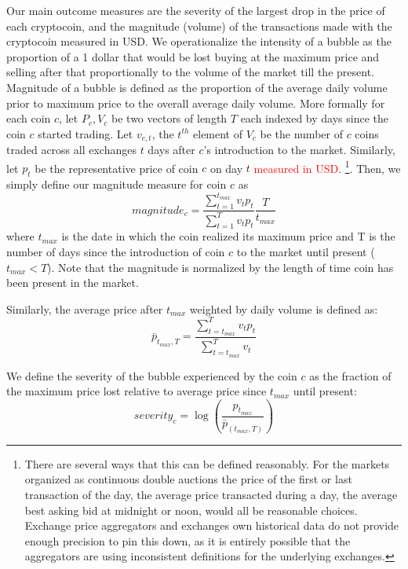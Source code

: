 Our main outcome measures are the severity of the largest drop in the price of each cryptocoin, and the magnitude (volume) of the transactions made with the cryptocoin measured in USD.
We operationalize the intensity of a bubble as the proportion of a 1 dollar that would be lost buying at the maximum price and selling after that proportionally to the volume of the market till the present. Magnitude of a bubble is defined as the proportion of the average daily volume prior to maximum price to the overall average daily volume.
More formally for each coin $c$, let $P_c,V_c$ be two vectors of length $T$ each indexed by days since the coin $c$ started trading.
Let $v_{c,t}$, the $t^{th}$ element of $V_c$ be the number of $c$ coins traded across all exchanges $t$ days after $c$'s introduction to the market. 
Similarly, let $p_t$ be the representative price of coin $c$ on day $t$ \textcolor{red}{measured in USD}.
\footnote{There are several ways that this can be defined reasonably. For the markets organized as continuous double auctions the price of the first or last transaction of the day,  the average price transacted during a day, the average best asking bid at midnight or noon, would all be reasonable choices. Exchange price aggregators and exchanges own historical data do not provide enough precision to pin this down, as it is entirely possible that the aggregators are using inconsistent definitions for the underlying exchanges.}. Then, we simply define our magnitude measure for coin $c$ as
\begin{equation}
magnitude_{c} = \frac{\sum_{t=1}^{t_{max}} v_t p_t} {\sum_{t=1}^{T} v_t  p_t} \frac{T}{t_{max}}
\end{equation}
where $t_{max}$ is the date in which the coin realized its maximum price and T is the number of days since the introduction of coin $c$ to the market until present ($t_{max} < T$). Note that the magnitude is normalized by the length of time coin has been present in the market.

Similarly, the average price after $t_{max}$ weighted by daily volume is defined as:
\begin{equation}
\bar{p}_{t_{max},T} = \frac{\sum_{t=t_{max}}^{T} v_t p_t} {\sum_{t=t_{max}}^{T} v_t}
\end{equation}

We define the severity of the bubble experienced by the coin $c$ as the fraction of the maximum price lost relative to average price since $t_{max}$ until present:
\begin{equation}
severity_{c} = \log(\frac{ p_{t_{max}}} {\bar{p}_{(t_{max},T)} })
\end{equation}
